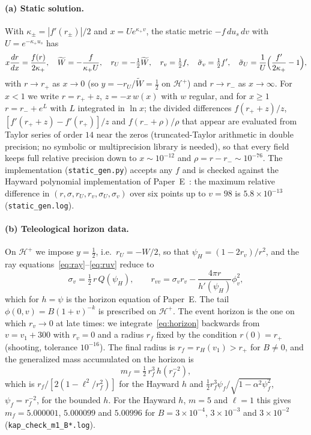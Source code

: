 \documentclass[11pt]{article}
\begin{document}
\paragraph{(a) Static solution.} With $\kappa_\pm=|f'(r_\pm)|/2$ and $x=Ue^{\kappa_+v}$, the static metric $-f\,du_s\,dv$ with $U=e^{-\kappa_+u_s}$ has
\begin{equation}
x\frac{dr}{dx}=\frac{f(r)}{2\kappa_+},\quad \widetilde W=-\frac{f}{\kappa_+U},\quad r_U=-\tfrac12\widetilde W,\quad r_v=\tfrac12f,\quad \tilde\sigma_v=\tfrac12f',\quad \tilde\sigma_U=\frac1U\Bigl(\frac{f'}{2\kappa_+}-1\Bigr),
\label{eq:static}
\end{equation}
with $r\to r_+$ as $x\to0$ (so $y=-r_U/\widetilde W=\tfrac12$ on $\mathcal H^{+}$) and $r\to r_-$ as $x\to\infty$. For $x<1$ we write $r=r_++z$, $z=-x\,w(x)$ with $w$ regular, and for $x\ge1$ $r=r_-+e^{L}$ with $L$ integrated in $\ln x$; the divided differences $f(r_++z)/z$, $[f'(r_++z)-f'(r_+)]/z$ and $f(r_-+\rho)/\rho$ that appear are evaluated from Taylor series of order $14$ near the zeros (truncated-Taylor arithmetic in double precision; no symbolic or multiprecision library is needed), so that every field keeps full relative precision down to $x\sim10^{-12}$ and $\rho=r-r_-\sim10^{-76}$. The implementation (\texttt{static\_gen.py}) accepts any $f$ and is checked against the Hayward polynomial implementation of Paper~E~\citep{PaperE}: the maximum relative difference in $(r,\sigma,r_U,r_v,\sigma_U,\sigma_v)$ over six points up to $v=98$ is $5.8\times10^{-13}$ (\texttt{static\_gen.log}).

\paragraph{(b) Teleological horizon data.} On $\mathcal H^{+}$ we impose $y=\tfrac12$, i.e.\ $r_U=-W/2$, so that $\psi_H=(1-2r_v)/r^{2}$, and the ray equations~\eqref{eq:ray}--\eqref{eq:ruv} reduce to
\begin{equation}
\sigma_v=\tfrac12\,r\,Q(\psi_H),\qquad r_{vv}=\sigma_vr_v-\frac{4\pi r}{h'(\psi_H)}\phi_v^{2},
\label{eq:horizon}
\end{equation}
which for $h=\psi$ is the horizon equation of Paper~E. The tail $\phi(0,v)=B(1+v)^{-k}$ is prescribed on $\mathcal H^{+}$. The event horizon is the one on which $r_v\to0$ at late times: we integrate~\eqref{eq:horizon} backwards from $v=v_1+300$ with $r_v=0$ and a radius $r_f$ fixed by the condition $r(0)=r_+$ (shooting, tolerance $10^{-16}$). The final radius is $r_f=r_H(v_1)>r_+$ for $B\neq0$, and the generalized mass accumulated on the horizon is
\begin{equation}
m_f=\tfrac12\,r_f^{3}\,h(r_f^{-2}),
\label{eq:mf}
\end{equation}
which is $r_f/[2(1-\ell^{2}/r_f^{2})]$ for the Hayward $h$ and $\tfrac12r_f^{3}\psi_f/\sqrt{1-\alpha^{2}\psi_f^{2}}$, $\psi_f=r_f^{-2}$, for the bounded $h$. For the Hayward $h$, $m=5$ and $\ell=1$ this gives $m_f=5.000001$, $5.000099$ and $5.00996$ for $B=3\times10^{-4}$, $3\times10^{-3}$ and $3\times10^{-2}$ (\texttt{kap\_check\_m1\_B*.log}).
\end{document}
